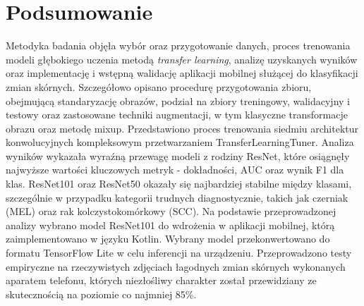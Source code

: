\section{Podsumowanie}
Metodyka badania objęła wybór oraz przygotowanie danych, proces trenowania modeli głębokiego uczenia metodą \textit{transfer learning}, analizę uzyskanych wyników oraz implementację i wstępną walidację aplikacji mobilnej służącej do klasyfikacji zmian skórnych.
Szczegółowo opisano procedurę przygotowania zbioru, obejmującą standaryzację obrazów, podział na zbiory treningowy, walidacyjny i testowy oraz zastosowane techniki augmentacji, w tym klasyczne transformacje obrazu oraz metodę mixup.
Przedstawiono proces trenowania siedmiu architektur konwolucyjnych kompleksowym przetwarzaniem TransferLearningTuner.
Analiza wyników wykazała wyraźną przewagę modeli z rodziny ResNet, które osiągnęły najwyższe wartości kluczowych metryk - dokładności, AUC oraz wynik F1 dla klas.
ResNet101 oraz ResNet50 okazały się najbardziej stabilne między klasami, szczególnie w przypadku kategorii trudnych diagnostycznie, takich jak czerniak (MEL) oraz rak kolczystokomórkowy (SCC).
Na podstawie przeprowadzonej analizy wybrano model ResNet101 do wdrożenia w aplikacji mobilnej, którą zaimplementowano w języku Kotlin.
Wybrany model przekonwertowano do formatu TensorFlow Lite w celu inferencji na urządzeniu.
Przeprowadzono testy empiryczne na rzeczywistych zdjęciach łagodnych zmian skórnych wykonanych aparatem telefonu, których niezłośliwy charakter został przewidziany ze skutecznością na poziomie co najmniej 85\%.


